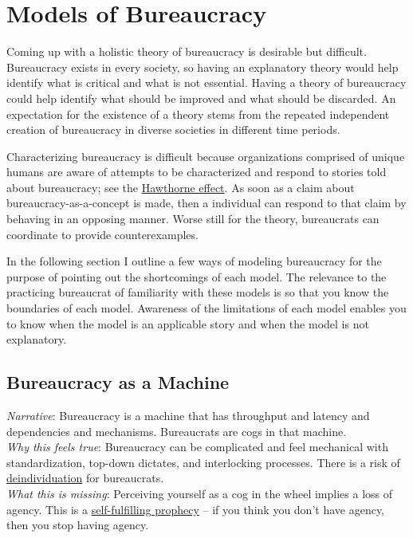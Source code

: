 \section{Models of Bureaucracy\label{sec:models-of-bureaucracy}}

Coming up with a holistic theory of bureaucracy is desirable but difficult. Bureaucracy exists in every society, so having an explanatory theory would help identify what is critical and what is not essential. Having a theory of bureaucracy could help identify what should be improved and what should be discarded. An expectation for the existence of a theory stems from the repeated independent creation of bureaucracy in diverse societies in different time periods. 

Characterizing bureaucracy is difficult because organizations comprised of unique humans are aware of attempts to be characterized and respond to stories told about bureaucracy; see the \href{https://en.wikipedia.org/wiki/Hawthorne_effect}{Hawthorne effect}. As soon as a claim about bureaucracy-as-a-concept is made, then a individual can respond to that claim by behaving in an opposing manner. Worse still for the theory, bureaucrats can coordinate to provide counterexamples. 

In the following section I outline a few ways of modeling bureaucracy for the purpose of pointing out the shortcomings of each model. The relevance to the practicing bureaucrat of familiarity with these models is so that you know the boundaries of each model. Awareness of the limitations of each model enables you to know when the model is an applicable story and when the model is not explanatory. 

\subsection{Bureaucracy as a Machine}

\textit{Narrative}: Bureaucracy is a machine that has throughput and latency and dependencies and mechanisms. Bureaucrats are cogs in that machine.\\
\textit{Why this feels true}: Bureaucracy can be complicated and feel mechanical with standardization, top-down dictates, and interlocking processes. There is a risk of \href{https://en.wikipedia.org/wiki/Deindividuation}{deindividuation} for bureaucrats. \\
\textit{What this is missing}: Perceiving yourself as a cog in the wheel implies a loss of agency. This is a \href{https://en.wikipedia.org/wiki/Self-fulfilling_prophecy}{self-fulfilling prophecy} -- if you think you don't have agency, then you stop having agency. 

